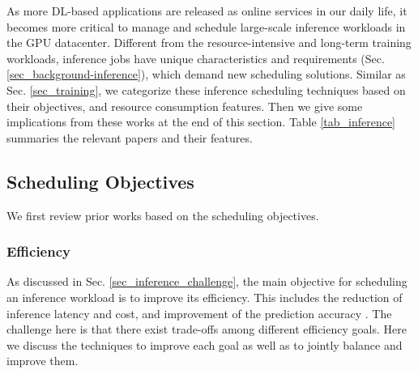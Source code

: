 As more DL-based applications are released as online services in our daily life, it becomes more critical to manage and schedule large-scale inference workloads in the GPU datacenter. 
Different from the resource-intensive and long-term training workloads, inference jobs have unique characteristics and requirements (Sec. \ref{sec_background-inference}), which demand new scheduling solutions.
Similar as Sec. \ref{sec_training}, we categorize these inference scheduling techniques based on their objectives, and resource consumption features. Then we give some implications from these works at the end of this section. Table \ref{tab_inference} summaries the relevant papers and their features.





\subsection{Scheduling Objectives}

We first review prior works based on the scheduling objectives.


\subsubsection{Efficiency}
\label{sec_accuracy_latency_cost}


As discussed in Sec. \ref{sec_inference_challenge}, the main objective for scheduling an inference workload is to improve its efficiency. This includes the reduction of inference latency and cost, and improvement of the prediction accuracy {\tiny{}}. The challenge here is that there exist trade-offs among different efficiency goals. Here we discuss the techniques to improve each goal as well as to jointly balance and improve them.





